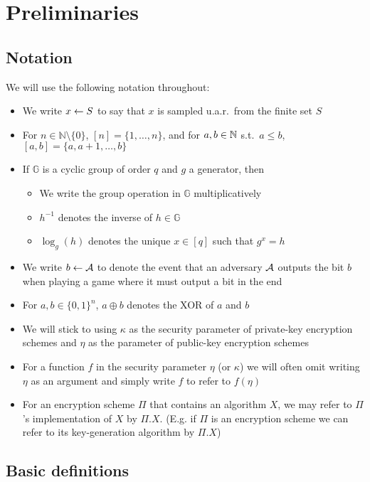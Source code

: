 \section{Preliminaries}

\subsection{Notation}

We will use the following notation throughout:
\begin{itemize}
	\item We write $x \leftarrow S$ to say that $x$ is sampled u.a.r.\ from the finite set $S$
	\item For $n \in \mathbb{N} \setminus \{0\}$, $[n] = \{1, \ldots, n\}$, and for $a, b \in \mathbb{N}$ s.t.\ $a \le b$, $[a, b] = \{a, a + 1, \ldots, b\}$
	\item If $\mathbb{G}$ is a cyclic group of order $q$ and $g$ a generator, then
	      \begin{itemize}
		      \item We write the group operation in $\mathbb{G}$ multiplicatively
		      \item $h^{-1}$ denotes the inverse of $h \in \mathbb{G}$
		      \item $\log_g(h)$ denotes the unique $x \in [q]$ such that $g^x = h$
	      \end{itemize}
	\item We write $b \leftarrow \mathcal{A}$ to denote the event that an adversary $\mathcal{A}$ outputs the bit $b$ when playing a game where it must output a bit in the end
	\item For $a, b \in \{0, 1\}^n$, $a \oplus b$ denotes the XOR of $a$ and $b$
	\item We will stick to using $\kappa$ as the security parameter of private-key encryption schemes and $\eta$ as the parameter of public-key encryption schemes
	\item For a function $f$ in the security parameter $\eta$ (or $\kappa$) we will often omit writing $\eta$ as an argument and simply write $f$ to refer to $f(\eta)$
	\item For an encryption scheme $\Pi$ that contains an algorithm $X$, we may refer to $\Pi$'s implementation of $X$ by $\Pi.X$. (E.g. if $\Pi$ is an encryption scheme we can refer to its key-generation algorithm by $\Pi.X$)
\end{itemize}


\subsection{Basic definitions}


